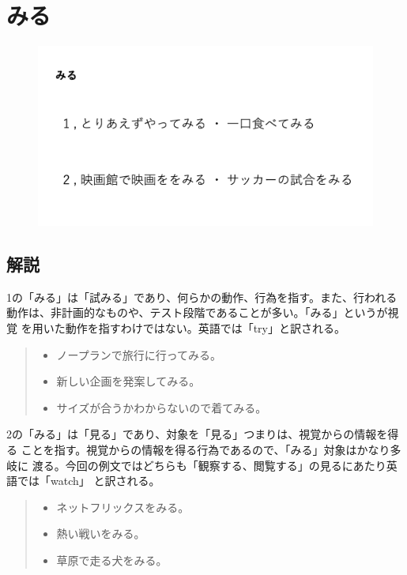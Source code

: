 \documentclass[dvipdfmx,autodetect-engine,titlepage]{jsarticle}
\begin{document}
\newpage

\section{みる}

\begin{figure}[h]
  \centering
  \includegraphics[scale=0.4]{pic2.png}
\end{figure}


\subsection*{解説}

1の「みる」は「試みる」であり、何らかの動作、行為を指す。また、行われる
動作は、非計画的なものや、テスト段階であることが多い。「みる」というが視覚
を用いた動作を指すわけではない。英語では「try」と訳される。
\begin{quote}
  \begin{itemize}
   \item ノープランで旅行に行ってみる。
   \item 新しい企画を発案してみる。
   \item サイズが合うかわからないので着てみる。
  \end{itemize}
 \end{quote}

2の「みる」は「見る」であり、対象を「見る」つまりは、視覚からの情報を得る
ことを指す。視覚からの情報を得る行為であるので、「みる」対象はかなり多岐に
渡る。今回の例文ではどちらも「観察する、閲覧する」の見るにあたり英語では「watch」
と訳される。
\begin{quote}
  \begin{itemize}
   \item ネットフリックスをみる。
   \item 熱い戦いをみる。
   \item 草原で走る犬をみる。
  \end{itemize}
 \end{quote}
\end{document}
